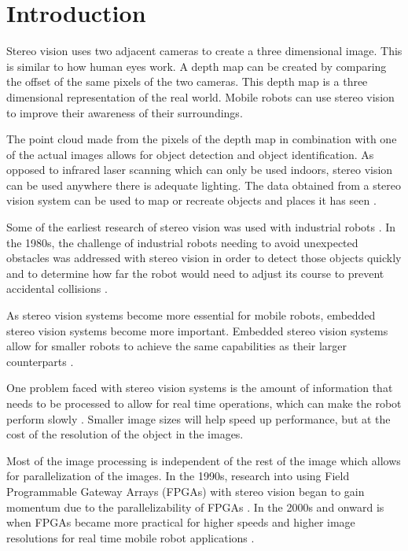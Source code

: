 \chapter{Introduction}
\label{sec:intro}

Stereo vision uses two adjacent cameras to create a three dimensional image. This is similar to how human eyes work. A depth map can be created by comparing the offset of the same pixels of the two cameras. This depth map is a three dimensional representation of the real world. Mobile robots can use stereo vision to improve their awareness of their surroundings.

The point cloud made from the pixels of the depth map in combination with one of the actual images allows for object detection and object identification. As opposed to infrared laser scanning which can only be used indoors, stereo vision can be used anywhere there is adequate lighting. The data obtained from a stereo vision system can be used to map or recreate objects and places it has seen \cite{actStereoMap}.

Some of the earliest research of stereo vision was used with industrial robots \cite{industRobot}. In the 1980s, the challenge of industrial robots needing to avoid unexpected obstacles was addressed with stereo vision in order to detect those objects quickly and to determine how far the robot would need to adjust its course to prevent accidental collisions \cite{3DVision}.

As stereo vision systems become more essential for mobile robots, embedded stereo vision systems become more important. Embedded stereo vision systems allow for smaller robots to achieve the same capabilities as their larger counterparts \cite{xilinxSpartan3ABoard}.

One problem faced with stereo vision systems is the amount of information that needs to be processed to allow for real time operations, which can make the robot perform slowly \cite{nav}. Smaller image sizes will help speed up performance, but at the cost of the resolution of the object in the images. 

Most of the image processing is independent of the rest of the image which allows for parallelization of the images. In the 1990s, research into using Field Programmable Gateway Arrays (FPGAs) with stereo vision began to gain momentum due to the parallelizability of FPGAs \cite{stereoFPGA}. In the 2000s and onward is when FPGAs became more practical for higher speeds and higher image resolutions for real time mobile robot applications \cite{fpga}.


